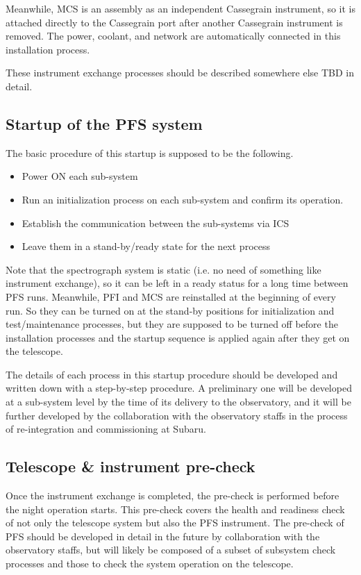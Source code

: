 \documentclass[a4paper]{article}
\begin{document}
Meanwhile, MCS is an assembly as an independent Cassegrain instrument,
so it is attached directly to the Cassegrain port after another
Cassegrain instrument is removed. The power, coolant, and network are
automatically connected in this installation process.

These instrument exchange processes should be described somewhere else
TBD in detail.

\subsection{Startup of the PFS system\label{sec:detail_ope_plan:startup}}

The basic procedure of this startup is supposed to be the following.

\begin{itemize}
\item Power ON each sub-system
\item Run an initialization process on each sub-system and confirm its
  operation.
\item Establish the communication between the sub-systems via ICS
\item Leave them in a stand-by/ready state for the next process
\end{itemize}

Note that the spectrograph system is static (i.e. no need of something
like instrument exchange), so it can be left in a ready status for a
long time between PFS runs. Meanwhile, PFI and MCS are reinstalled at
the beginning of every run. So they can be turned on at the stand-by
positions for initialization and test/maintenance processes, but they
are supposed to be turned off before the installation processes and
the startup sequence is applied again after they get on the telescope.

The details of each process in this startup procedure should be
developed and written down with a step-by-step procedure. A
preliminary one will be developed at a sub-system level by the time of
its delivery to the observatory, and it will be further developed by
the collaboration with the observatory staffs in the process of
re-integration and commissioning at Subaru.

\subsection{Telescope \& instrument pre-check\label{sec:detail_ope_plan:precheck}}
Once the instrument exchange is completed, the pre-check is performed
before the night operation starts. This pre-check covers the health
and readiness check of not only the telescope system but also the PFS
instrument. The pre-check of PFS should be developed in detail in the
future by collaboration with the observatory staffs, but will likely
be composed of a subset of subsystem check processes and those to
check the system operation on the telescope.
\end{document}
